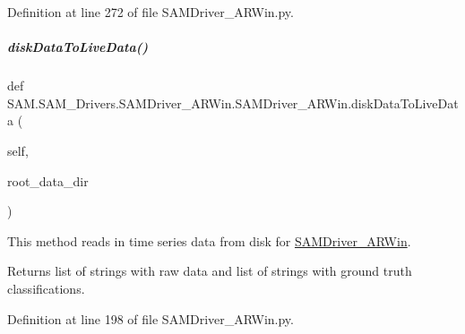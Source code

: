 Definition at line 272 of file S\+A\+M\+Driver\+\_\+\+A\+R\+Win.\+py.

\mbox{\label{group__icubclient__SAM__Drivers_abfdb7d58b7dde75f1e9dfdbd1c053264}} 
\subparagraph{\texorpdfstring{disk\+Data\+To\+Live\+Data()}{diskDataToLiveData()}}
{\footnotesize\ttfamily def S\+A\+M.\+S\+A\+M\+\_\+\+Drivers.\+S\+A\+M\+Driver\+\_\+\+A\+R\+Win.\+S\+A\+M\+Driver\+\_\+\+A\+R\+Win.\+disk\+Data\+To\+Live\+Data (\begin{DoxyParamCaption}\item[{}]{self,  }\item[{}]{root\+\_\+data\+\_\+dir }\end{DoxyParamCaption})}



This method reads in time series data from disk for \hyperlink{group__icubclient__SAM__Drivers_classSAM_1_1SAM__Drivers_1_1SAMDriver__ARWin_1_1SAMDriver__ARWin}{S\+A\+M\+Driver\+\_\+\+A\+R\+Win}. 

\begin{DoxyReturn}{Returns}
list of strings with raw data and list of strings with ground truth classifications. 
\end{DoxyReturn}


Definition at line 198 of file S\+A\+M\+Driver\+\_\+\+A\+R\+Win.\+py.


